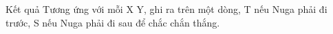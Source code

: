 Kết quả
Tương ứng với mỗi X Y, ghi ra trên một dòng, T nếu Nuga phải đi trước, S nếu Nuga phải đi sau để chắc chắn thắng.